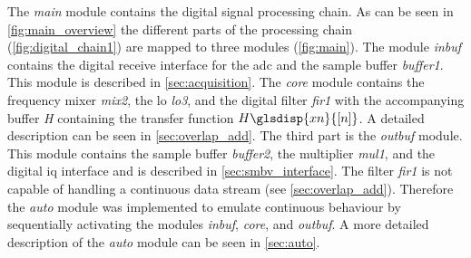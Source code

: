\documentclass[12pt,a4paper,parskip=full,abstract=true,BCOR=12mm,twoside,open=right]{scrreprt}
\def\device#1{\mbox{\textit{#1}}}
\newcommand{\XN}{\glsdisp{xn}{[n]}}
\begin{document}
The \device{main} module contains the digital signal processing chain. As can be seen
in \cref{fig:main_overview} the different parts of the processing chain (\cref{fig:digital_chain1}) are mapped
to three modules (\cref{fig:main}). The module \device{inbuf} contains the digital receive interface
for the \gls{adc} and the sample buffer \device{buffer1}. This module is described
in \cref{sec:acquisition}. The \device{core} module contains the frequency
mixer \device{mix2}, the \gls{lo} \device{lo3}, and the digital filter \device{fir1} with
the accompanying buffer \device{H} containing the transfer function $H\XN$.
A detailed description can be seen in \cref{sec:overlap_add}. The third part
is the \device{outbuf} module. This module contains the sample buffer \device{buffer2},
the multiplier \device{mul1}, and the digital \gls{iq} interface and is described in \cref{sec:smbv_interface}. The
filter \device{fir1} is not capable of handling a continuous data stream (see
\cref{sec:overlap_add}). Therefore the \device{auto} module was implemented to emulate
continuous behaviour by sequentially activating the modules \device{inbuf}, \device{core},
and \device{outbuf}. A more detailed description of the \device{auto} module can be seen
in \cref{sec:auto}.
\end{document}

